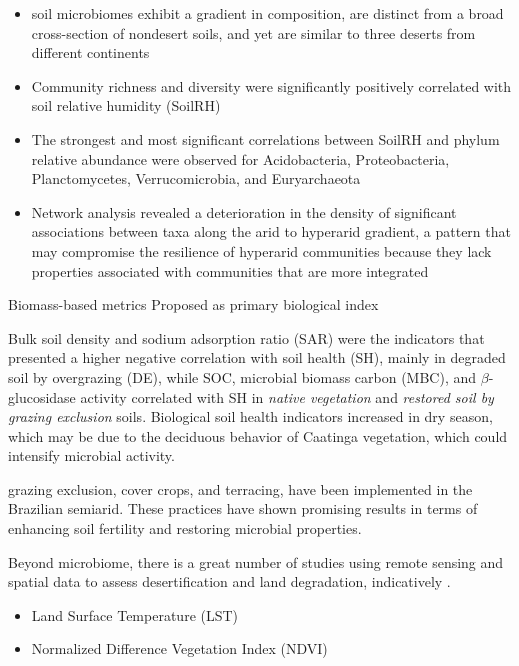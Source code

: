 \documentclass[a4paper,12pt]{article}
\begin{document}
\parencite{Neilson2017Significant}
\begin{itemize}
    \item soil microbiomes exhibit a gradient in composition, are distinct from a broad cross-section of nondesert soils, 
    and yet are similar to three deserts from different continents
    \item Community richness and diversity were significantly positively correlated with soil relative humidity (SoilRH)
    \item The strongest and most significant correlations between SoilRH and phylum relative abundance were observed for Acidobacteria, 
    Proteobacteria, Planctomycetes, Verrucomicrobia, and Euryarchaeota
    \item Network analysis revealed a deterioration in the density of significant associations between taxa along the arid to hyperarid gradient, 
    a pattern that may compromise the resilience of hyperarid communities because they lack properties associated with communities 
    that are more integrated
\end{itemize}
 

\bigbreak

\parencite{Lima2023Grazing}
Biomass-based metrics Proposed as primary biological index


Bulk soil density and sodium adsorption ratio (SAR) were the indicators that presented a higher negative correlation with soil health (SH), 
mainly in degraded soil by overgrazing (DE), while SOC, microbial biomass carbon (MBC), and $\beta$-glucosidase activity correlated with SH 
in \textit{native vegetation} and \textit{restored soil by grazing exclusion} soils. 
Biological soil health indicators increased in dry season, which may be due to the deciduous behavior of Caatinga vegetation, 
which could intensify microbial activity. 



grazing exclusion, cover crops, and terracing, have been implemented in the Brazilian semiarid. 
These practices have shown promising results in terms of enhancing soil fertility and restoring microbial properties. 


\bigbreak

Beyond microbiome, there is a great number of studies using remote sensing and spatial data to assess desertification and land degradation,
indicatively \parencite{liu2026remote, wu2026decoding}.


\begin{itemize}
    \item Land Surface Temperature (LST) 
    \item Normalized Difference Vegetation Index (NDVI) 
\end{itemize}
 
\end{document}
